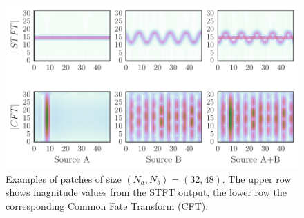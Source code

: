 \begin{figure}[b]
\centering
		\includegraphics[width=0.95\columnwidth]{Chapters/commonfate/figures/gridplot.pdf}
\caption{Examples of patches of size $(N_a, N_b) = (32, 48)$. The upper row shows magnitude values from the STFT output, the lower row the corresponding Common Fate Transform (CFT).}
\label{fig:gridplot}
\end{figure}


